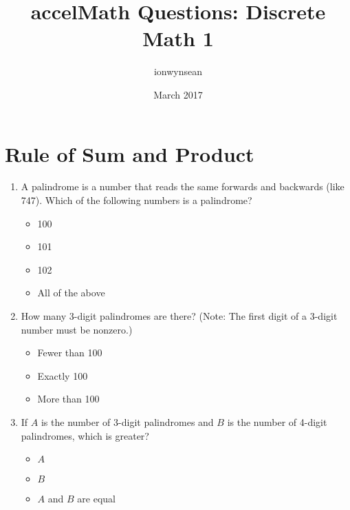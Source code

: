 \documentclass{article}
\title{accelMath Questions: Discrete Math 1}
\author{ionwynsean }
\date{March 2017}
\begin{document}
\maketitle

\section{Rule of Sum and Product}

\begin{enumerate}
    \item A palindrome is a number that reads the same forwards and backwards (like 747). Which of the following numbers is a palindrome?
    
        \begin{itemize}
            \item 100
            \item 101
            \item 102
            \item All of the above
        \end{itemize}
        
    \item How many 3-digit palindromes are there? (Note: The first digit of a 3-digit number must be nonzero.)
    
    \begin{itemize}
        \item Fewer than 100
        \item Exactly 100
        \item More than 100
    \end{itemize}
    
    \item If $A$ is the number of 3-digit palindromes and $B$ is the number of 4-digit palindromes, which is greater?
    
    \begin{itemize}
        \item $A$
        \item $B$
        \item $A$ and $B$ are equal
    \end{itemize}
    

\end{enumerate}
\end{document}
